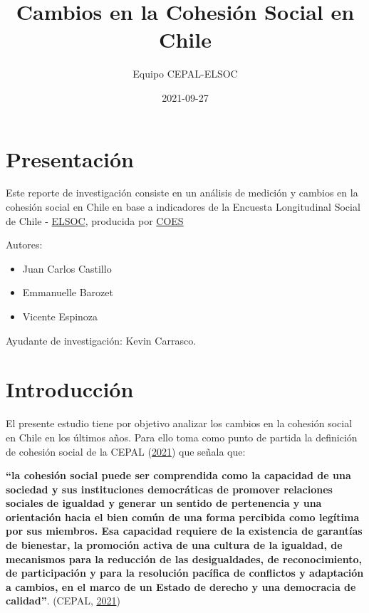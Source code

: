 \documentclass[
  12pt,
]{book}
\title{Cambios en la Cohesión Social en Chile}
\author{Equipo CEPAL-ELSOC}
\date{2021-09-27}
\providecommand{\tightlist}{%
  \setlength{\itemsep}{0pt}\setlength{\parskip}{0pt}}
\begin{document}
\maketitle

{
\hypersetup{linkcolor=}
\setcounter{tocdepth}{1}
\tableofcontents
}
\listoftables
\listoffigures
{}
\hypertarget{presentaciuxf3n}{%
\chapter*{Presentación}\label{presentaciuxf3n}}

Este reporte de investigación consiste en un análisis de medición y cambios en la cohesión social en Chile en base a indicadores de la Encuesta Longitudinal Social de Chile - \href{https://coes.cl/encuesta-panel/}{ELSOC}, producida por \href{https://coes.cl/}{COES}

Autores:

\begin{itemize}
\tightlist
\item
  Juan Carlos Castillo
\item
  Emmanuelle Barozet
\item
  Vicente Espinoza
\end{itemize}

Ayudante de investigación: Kevin Carrasco.

\hypertarget{introducciuxf3n}{%
\chapter*{Introducción}\label{introducciuxf3n}}

El presente estudio tiene por objetivo analizar los cambios en la cohesión social en Chile en los últimos años. Para ello toma como punto de partida la definición de cohesión social de la CEPAL (\protect\hyperlink{ref-cepal_cohesion_2021}{2021}) que señala que:

\textbf{``la cohesión social puede ser comprendida como la capacidad de una sociedad y sus instituciones democráticas de promover relaciones sociales de igualdad y generar un sentido de pertenencia y una orientación hacia el bien común de una forma percibida como legítima por sus miembros. Esa capacidad requiere de la existencia de garantías de bienestar, la promoción activa de una cultura de la igualdad, de mecanismos para la reducción de las desigualdades, de reconocimiento, de participación y para la resolución pacífica de conflictos y adaptación a cambios, en el marco de un Estado de derecho y una democracia de calidad''}. (CEPAL, \protect\hyperlink{ref-cepal_cohesion_2021}{2021})
\end{document}

